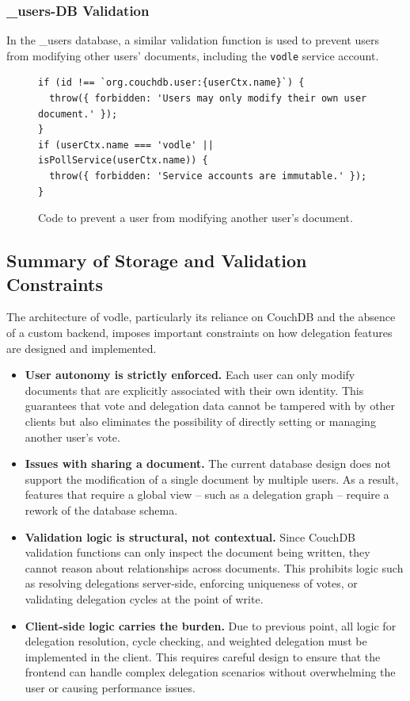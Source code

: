 \subsubsection{\_users-DB Validation}
In the \_users database, a similar validation function is used to prevent users from modifying other users' documents, including the \texttt{vodle} service account.
\begin{figure}[H]
\begin{verbatim}
if (id !== `org.couchdb.user:{userCtx.name}`) {
  throw({ forbidden: 'Users may only modify their own user document.' });
}
if (userCtx.name === 'vodle' || isPollService(userCtx.name)) {
  throw({ forbidden: 'Service accounts are immutable.' });
}
\end{verbatim}
\caption{Code to prevent a user from modifying another user's document.}
\end{figure}

\subsection{Summary of Storage and Validation Constraints}
\label{subsec:summary_storage_constraints}

The architecture of vodle, particularly its reliance on CouchDB and the absence of a custom backend, imposes important constraints on how delegation features are designed and implemented.

\begin{itemize}
  \item \textbf{User autonomy is strictly enforced.} Each user can only modify documents that are explicitly associated with their own identity. This guarantees that vote and delegation data cannot be tampered with by other clients but also eliminates the possibility of directly setting or managing another user's vote.

  \item \textbf{Issues with sharing a document.} The current database design does not support the modification of a single document by multiple users. As a result, features that require a global view -- such as a delegation graph -- require a rework of the database schema.

  \item \textbf{Validation logic is structural, not contextual.} Since CouchDB validation functions can only inspect the document being written, they cannot reason about relationships across documents. This prohibits logic such as resolving delegations server-side, enforcing uniqueness of votes, or validating delegation cycles at the point of write.

  \item \textbf{Client-side logic carries the burden.} Due to previous point, all logic for delegation resolution, cycle checking, and weighted delegation must be implemented in the client. This requires careful design to ensure that the frontend can handle complex delegation scenarios without overwhelming the user or causing performance issues.
\end{itemize}

